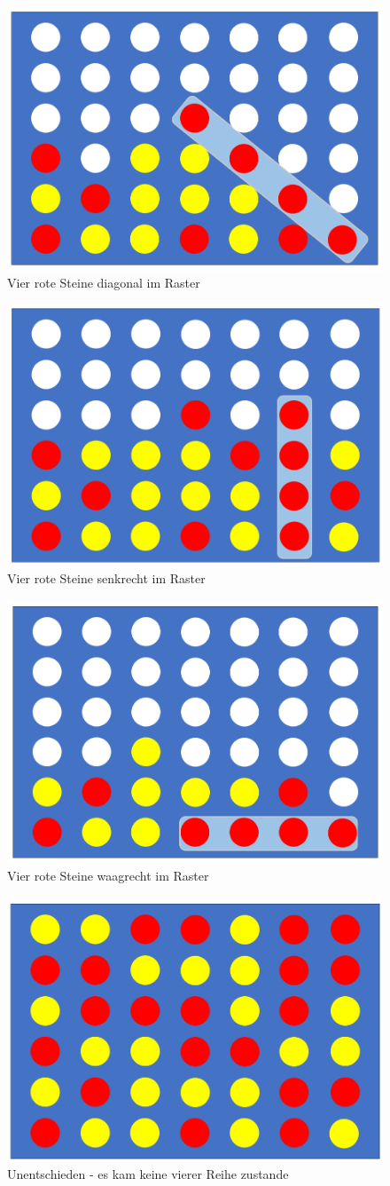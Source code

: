 \begin{figure}[H]
	\centering
	\includegraphics[width=0.6\linewidth]{images/Diagonal}
	\caption[Vier rote Steine diagonal]{Vier rote Steine diagonal im Raster}
	\label{fig:diagonal}
\end{figure}
\begin{figure}[H]
	\centering
	\includegraphics[width=0.6\linewidth]{images/Senkrecht}
	\caption[Vier rote Steine in Reihe senkrecht]{Vier rote Steine senkrecht im Raster}
	\label{fig:senkrecht}
\end{figure}
\begin{figure}[H]
	\centering
	\includegraphics[width=0.6\linewidth]{images/Waagrecht}
	\caption[Vier rote Steine in Reihe waagrecht]{Vier rote Steine waagrecht im Raster}
	\label{fig:waagrecht}
\end{figure}
\begin{figure}[H]
	\centering
	\includegraphics[width=0.6\linewidth]{images/Unentschieden}
	\caption[Unentschieden]{Unentschieden - es kam keine vierer Reihe zustande}
	\label{fig:unentschiedent}
\end{figure}
\newpage
